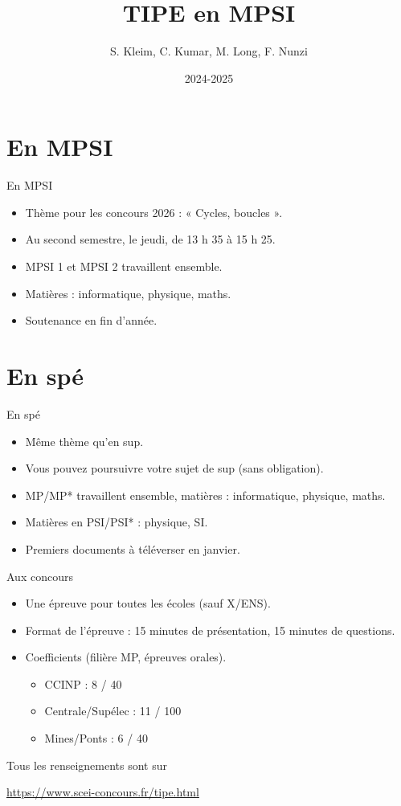 \documentclass{beamer}
\title{TIPE en MPSI}
\author{S. Kleim, C. Kumar, M. Long, F. Nunzi}
\institute{Lycée La Martinière Monplaisir, Lyon}
\date{2024-2025}
\begin{document}
\begin{frame}
\titlepage
\end{frame}
\section{En MPSI}
\begin{frame}{En MPSI}
\begin{itemize}
\item Thème pour les concours 2026 : « Cycles, boucles ».
\item Au second semestre, le jeudi, de 13 h 35 à 15 h 25.
\item MPSI 1 et MPSI 2 travaillent ensemble. 
\item Matières : informatique, physique, maths. 
\item Soutenance en fin d'année. 
\end{itemize}

\end{frame}

\section{En spé}
\begin{frame}{En spé}
\begin{itemize}
\item Même thème qu'en sup. 
\item Vous pouvez poursuivre votre sujet de sup (sans obligation). 
\item MP/MP* travaillent ensemble, matières : informatique, physique, maths.
\item Matières en PSI/PSI* : physique, SI. 
\item Premiers documents à téléverser en janvier. 
\end{itemize}
\end{frame}

\begin{frame}{Aux concours}
    \begin{itemize}
        \item Une épreuve pour toutes les écoles (sauf X/ENS). 
        \item Format de l'épreuve : 15 minutes de présentation, 15 minutes de questions. 
        \item Coefficients (filière MP, épreuves orales). 
            \begin{itemize}
                \item CCINP : 8 / 40
                \item Centrale/Supélec : 11 / 100
                \item Mines/Ponts : 6 / 40
            \end{itemize}
    \end{itemize}
    Tous les renseignements sont sur 
    \begin{center}
        \url{https://www.scei-concours.fr/tipe.html}
    \end{center}
\end{frame}
\end{document}
